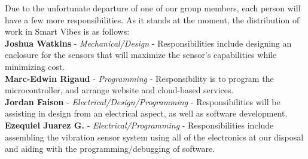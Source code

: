 \documentclass[12pt]{article}
\begin{document}
Due to the unfortunate departure of one of our group members, each person will have a few more responsibilities. As it stands at the moment, the distribution of work in Smart Vibes is as follows:\\

\noindent \textbf{Joshua Watkins} - \textit{Mechanical/Design} - Responsibilities include designing an enclosure for the sensors that will maximize the sensor's capabilities while minimizing cost.\\

\noindent \textbf{Marc-Edwin Rigaud} - \textit{Programming} - Responsibility is to program the microcontroller, and arrange website and cloud-based services.\\

\noindent \textbf{Jordan Faison} - \textit{Electrical/Design/Programming} - Responsibilities will be assisting in design from an electrical aspect, as well as software development.\\

\noindent \textbf{Ezequiel Juarez G.} - \textit{Electrical/Programming} - Responsibilities include assembling the vibration sensor system using all of the electronics at our disposal and aiding with the programming/debugging of software.
\end{document}
